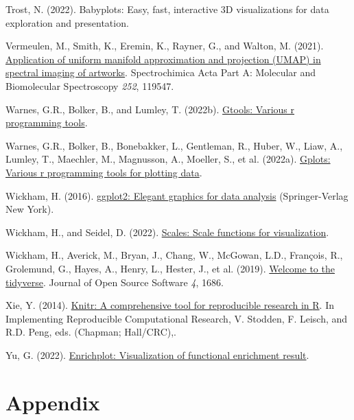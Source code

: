 \documentclass[
  parskip,
  oneside]{scrreprt}
\newlength{\cslhangindent}
\newlength{\cslentryspacingunit} %
\newenvironment{CSLReferences}[2] %
 {%
  \setlength{\parindent}{0pt}
  \ifodd #1
  \let\oldpar\par
  \def\par{\hangindent=\cslhangindent\oldpar}
  \fi
  \setlength{\parskip}{#2\cslentryspacingunit}
 }%
 {}
\begin{document}
\begin{CSLReferences}{0}{0}
\leavevmode{}%
Trost, N. (2022). Babyplots: Easy, fast, interactive 3D visualizations
for data exploration and presentation.

\leavevmode{}%
Vermeulen, M., Smith, K., Eremin, K., Rayner, G., and Walton, M. (2021).
\href{https://doi.org/10.1016/j.saa.2021.119547}{Application of uniform
manifold approximation and projection (UMAP) in spectral imaging of
artworks}. Spectrochimica Acta Part A: Molecular and Biomolecular
Spectroscopy \emph{252}, 119547.

\leavevmode{}%
Warnes, G.R., Bolker, B., and Lumley, T. (2022b).
\href{https://github.com/r-gregmisc/gtools}{Gtools: Various r
programming tools}.

\leavevmode{}%
Warnes, G.R., Bolker, B., Bonebakker, L., Gentleman, R., Huber, W.,
Liaw, A., Lumley, T., Maechler, M., Magnusson, A., Moeller, S., et al.
(2022a). \href{https://CRAN.R-project.org/package=gplots}{Gplots:
Various r programming tools for plotting data}.

\leavevmode{}%
Wickham, H. (2016). \href{https://ggplot2.tidyverse.org}{ggplot2:
Elegant graphics for data analysis} (Springer-Verlag New York).

\leavevmode{}%
Wickham, H., and Seidel, D. (2022).
\href{https://CRAN.R-project.org/package=scales}{Scales: Scale functions
for visualization}.

\leavevmode{}%
Wickham, H., Averick, M., Bryan, J., Chang, W., McGowan, L.D., François,
R., Grolemund, G., Hayes, A., Henry, L., Hester, J., et al. (2019).
\href{https://doi.org/10.21105/joss.01686}{Welcome to the {tidyverse}}.
Journal of Open Source Software \emph{4}, 1686.

\leavevmode{}%
Xie, Y. (2014).
\href{http://www.crcpress.com/product/isbn/9781466561595}{Knitr: A
comprehensive tool for reproducible research in {R}}. In Implementing
Reproducible Computational Research, V. Stodden, F. Leisch, and R.D.
Peng, eds. (Chapman; Hall/CRC),.

\leavevmode{}%
Yu, G. (2022).
\href{https://yulab-smu.top/biomedical-knowledge-mining-book/}{Enrichplot:
Visualization of functional enrichment result}.

\end{CSLReferences}

\hypertarget{appendix}{%
\chapter{Appendix}\label{appendix}}
\end{document}
